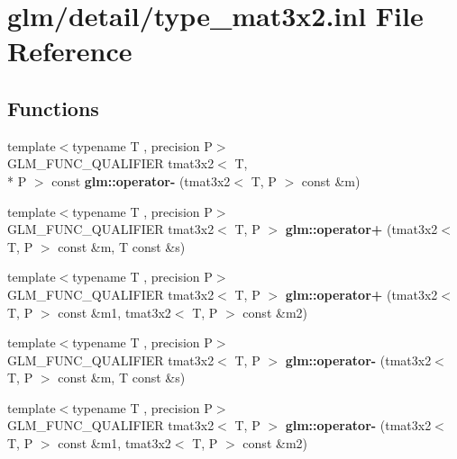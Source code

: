 \hypertarget{type__mat3x2_8inl}{\section{glm/detail/type\-\_\-mat3x2.inl File Reference}
\label{type__mat3x2_8inl}
}
\subsection*{Functions}
\begin{DoxyCompactItemize}
\item 
\hypertarget{namespaceglm_a59bad5c5e258de15830bed5e0487e342}{{\footnotesize template$<$typename T , precision P$>$ }\\G\-L\-M\-\_\-\-F\-U\-N\-C\-\_\-\-Q\-U\-A\-L\-I\-F\-I\-E\-R tmat3x2$<$ T, \\*
P $>$ const {\bfseries glm\-::operator-\/} (tmat3x2$<$ T, P $>$ const \&m)}\label{namespaceglm_a59bad5c5e258de15830bed5e0487e342}

\item 
\hypertarget{namespaceglm_a9e5889d192060bf4786927aceabf95ef}{{\footnotesize template$<$typename T , precision P$>$ }\\G\-L\-M\-\_\-\-F\-U\-N\-C\-\_\-\-Q\-U\-A\-L\-I\-F\-I\-E\-R tmat3x2$<$ T, P $>$ {\bfseries glm\-::operator+} (tmat3x2$<$ T, P $>$ const \&m, T const \&s)}\label{namespaceglm_a9e5889d192060bf4786927aceabf95ef}

\item 
\hypertarget{namespaceglm_a16ca58b9b3b4625e4b708c8a91df3a71}{{\footnotesize template$<$typename T , precision P$>$ }\\G\-L\-M\-\_\-\-F\-U\-N\-C\-\_\-\-Q\-U\-A\-L\-I\-F\-I\-E\-R tmat3x2$<$ T, P $>$ {\bfseries glm\-::operator+} (tmat3x2$<$ T, P $>$ const \&m1, tmat3x2$<$ T, P $>$ const \&m2)}\label{namespaceglm_a16ca58b9b3b4625e4b708c8a91df3a71}

\item 
\hypertarget{namespaceglm_a8243cba905c1840613c1b277b751759c}{{\footnotesize template$<$typename T , precision P$>$ }\\G\-L\-M\-\_\-\-F\-U\-N\-C\-\_\-\-Q\-U\-A\-L\-I\-F\-I\-E\-R tmat3x2$<$ T, P $>$ {\bfseries glm\-::operator-\/} (tmat3x2$<$ T, P $>$ const \&m, T const \&s)}\label{namespaceglm_a8243cba905c1840613c1b277b751759c}

\item 
\hypertarget{namespaceglm_a217d480e9710e6861a9b0bfeb767758c}{{\footnotesize template$<$typename T , precision P$>$ }\\G\-L\-M\-\_\-\-F\-U\-N\-C\-\_\-\-Q\-U\-A\-L\-I\-F\-I\-E\-R tmat3x2$<$ T, P $>$ {\bfseries glm\-::operator-\/} (tmat3x2$<$ T, P $>$ const \&m1, tmat3x2$<$ T, P $>$ const \&m2)}\label{namespaceglm_a217d480e9710e6861a9b0bfeb767758c}


\end{DoxyCompactItemize}
